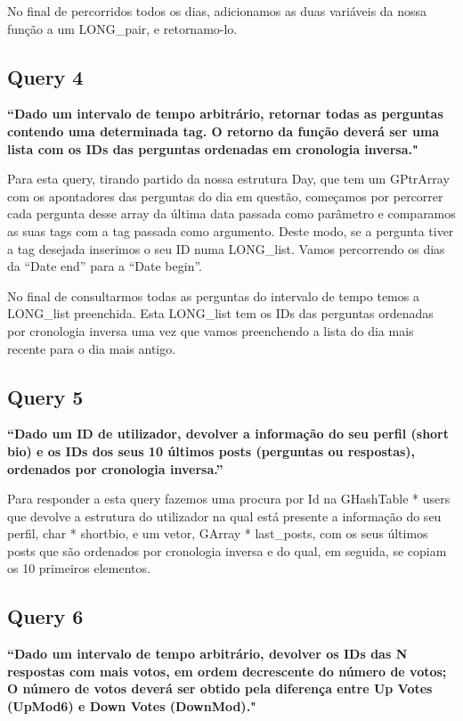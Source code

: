 \documentclass[a4paper]{report}
\begin{document}
No final de percorridos todos os dias, adicionamos as duas variáveis da nossa função a um LONG\_pair, e retornamo-lo.


\subsection*{Query 4}
\label{sec:query4}

\textbf{“Dado um intervalo de tempo arbitrário, retornar todas as perguntas contendo uma determinada tag.
O retorno da função deverá ser uma lista com os IDs das perguntas ordenadas em cronologia inversa."}

Para esta query, tirando partido da nossa estrutura Day, que tem um GPtrArray com
os apontadores das perguntas do dia em questão, começamos por percorrer cada pergunta desse array
da última data passada como parâmetro e comparamos as suas tags com a tag passada como argumento.
Deste modo, se a pergunta tiver a tag desejada inserimos o seu ID numa LONG\_list.
Vamos percorrendo os dias da “Date end” para a “Date begin”.

No final de consultarmos todas as perguntas do intervalo de tempo temos a LONG\_list preenchida.
Esta LONG\_list tem os IDs das perguntas ordenadas por cronologia inversa uma vez que
vamos preenchendo a lista do dia mais recente para o dia mais antigo.



\subsection*{Query 5}
\label{sec:query5}

\textbf{“Dado um ID de utilizador,  devolver a informação do
seu perfil (short bio) e os IDs dos seus 10 últimos posts (perguntas ou respostas),
ordenados por cronologia inversa.”}

Para responder a esta query fazemos uma procura por Id na GHashTable * users que devolve
a estrutura do utilizador na qual está presente a informação do
seu perfil, char * shortbio, e um vetor, GArray * last\_posts, com os seus últimos posts que são
ordenados por cronologia inversa e do qual, em seguida, se copiam os 10 primeiros
elementos.

\subsection*{Query 6}
\label{sec:query6}

\textbf{“Dado um intervalo de tempo arbitrário, devolver os IDs das N respostas
com mais votos, em ordem decrescente do número de votos; O número de votos deverá
ser obtido pela diferença entre Up Votes (UpMod6) e Down Votes (DownMod)."}
\end{document}
